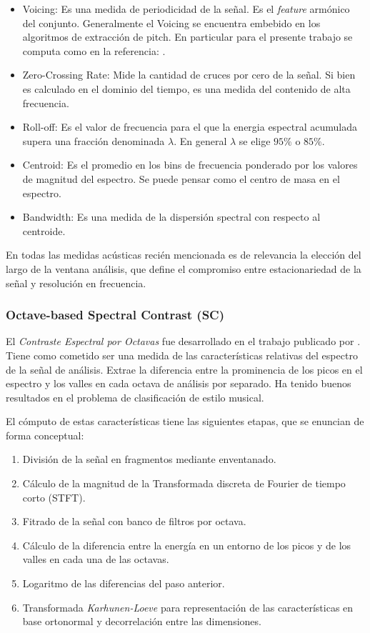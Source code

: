 \documentclass{article}
\begin{document}
\begin{itemize}
	\item Voicing: Es una medida de periodicidad de la señal. Es el \textit{feature} armónico del conjunto. Generalmente el Voicing se encuentra embebido en los algoritmos de extracción de pitch. En particular para el presente trabajo se computa como en la referencia: \cite{de2002yin}.   
	\item Zero-Crossing Rate: Mide la cantidad de cruces por cero de la señal. Si bien es calculado en el dominio del tiempo, es una medida del contenido de alta frecuencia.
	\item Roll-off: Es el valor de frecuencia para el que la energia espectral acumulada supera una fracción denominada $\lambda$. En general $\lambda$ se elige $95\%$ o $85\%$. 
	\item Centroid: Es el promedio en los bins de frecuencia ponderado por los valores de magnitud del espectro. Se puede pensar como el centro de masa en el espectro. 
	\item Bandwidth: Es una medida de la dispersión spectral con respecto al centroide.
\end{itemize}

En todas las medidas acústicas recién mencionada es de relevancia la elección del largo de la ventana análisis, que define el compromiso entre estacionariedad de la señal y resolución en frecuencia.

\subsubsection{Octave-based Spectral Contrast (SC)}

El \textit{Contraste Espectral por Octavas} fue desarrollado en el trabajo publicado por \cite{jiang2002music}. Tiene como cometido ser una medida de las características relativas del espectro de la señal de análisis. Extrae la diferencia entre la prominencia de los picos en el espectro y los valles en cada octava de análisis por separado. Ha tenido buenos resultados en el problema de clasificación de estilo musical.
\medskip

El cómputo de estas características tiene las siguientes etapas, que se enuncian de forma conceptual:

\begin{enumerate}
	\item División de la señal en fragmentos mediante enventanado.
	\item Cálculo de la magnitud de la Transformada discreta de Fourier de tiempo corto (STFT).
	\item Fitrado de la señal con banco de filtros por octava.
	\item Cálculo de la diferencia entre la energía en un entorno de los picos y de los valles en cada una de las octavas.
	\item Logaritmo de las diferencias del paso anterior.
	\item Transformada \textit{Karhunen-Loeve} para representación de las características en base ortonormal y decorrelación entre las dimensiones.
\end{enumerate}
\end{document}
